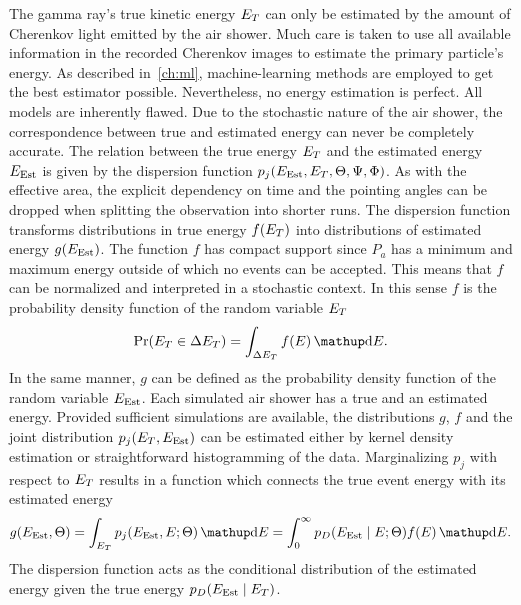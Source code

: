 The gamma ray's true kinetic energy $E_T$ can only be estimated by the amount of Cherenkov light emitted by the air shower. 
Much care is taken to use all available information in the recorded Cherenkov images to estimate the primary particle's energy.
As described in~\cref{ch:ml}, machine-learning methods are employed to get the best estimator possible. 
Nevertheless, no energy estimation is perfect. All models are inherently flawed.
Due to the stochastic nature of the air shower, the correspondence between true and estimated energy can never be completely accurate.
The relation between the true energy $E_T$ and the estimated energy $E_\text{Est}$
is given by the dispersion function $p_j(E_\text{Est}, E_T, \Theta, \Psi, \Phi)$.
As with the effective area, the explicit dependency on time and the pointing angles can be dropped when splitting the observation into shorter runs. 
The dispersion function transforms distributions in true energy $f(E_T)$ into distributions of estimated energy $g(E_\text{Est})$.
The function $f$  has compact support since $P_a$ has a minimum and maximum energy outside of which no events can be accepted. 
This means that $f$ can be normalized and interpreted in a stochastic context. In this sense $f$ is the probability density function of the random variable $E_T$
\begin{equation*}
  \operatorname{Pr}(\etrue \in \Delta \etrue) = \int_{\Delta \etrue} f(E) \diff{E}.
\end{equation*}
In the same manner, $g$ can be defined as the probability density function of the random variable $E_\text{Est}$.
Each simulated air shower has a true and an estimated energy. Provided sufficient simulations
are available, the distributions $g$, $f$ and the joint distribution $p_j(E_T, E_\text{Est})$ can be estimated either by kernel density estimation 
or straightforward histogramming of the data.
Marginalizing $p_j$ with respect to $E_T$ results in a function which connects the true event energy with its estimated energy
\begin{equation}
  \label{eq:dispersion_prob}
  g(\eest, \Theta) = \int_{\etrue} p_j(\eest,  E; \Theta) \diff{E} =  \int_{0}^{\infty} p_D(\eest \mid E; \Theta) f(E) \diff{E}.
\end{equation}
The dispersion function acts as the conditional distribution of the estimated energy given the true energy $p_D(E_\text{Est} \mid E_T)$.
